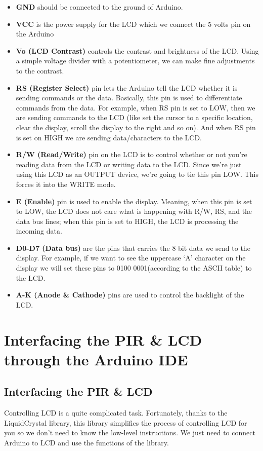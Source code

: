 \begin{itemize}
  \item \textbf{GND} should be connected to the ground of Arduino.
  \item \textbf{VCC} is the power supply for the LCD which we connect the 5 volts pin on the Arduino
  \item \textbf{Vo (LCD Contrast) } controls the contrast and brightness of the LCD. Using a simple voltage divider with a potentiometer, we can make fine adjustments to the contrast.
  \item \textbf{RS (Register Select) }  pin lets the Arduino tell the LCD whether it is sending commands or the data. Basically, this pin is used to differentiate commands from the data.
For example, when RS pin is set to LOW, then we are sending commands to the LCD (like set the cursor to a specific location, clear the display, scroll the display to the right and so on). And when RS pin is set on HIGH we are sending data/characters to the LCD.
  \item \textbf{R/W (Read/Write) } pin on the LCD is to control whether or not you’re reading data from the LCD or writing data to the LCD. Since we’re just using this LCD as an OUTPUT device, we’re going to tie this pin LOW. This forces it into the WRITE mode.
  \item \textbf{E (Enable) } pin is used to enable the display. Meaning, when this pin is set to LOW, the LCD does not care what is happening with R/W, RS, and the data bus lines; when this pin is set to HIGH, the LCD is processing the incoming data.
  \item \textbf{D0-D7 (Data bus) } are the pins that carries the 8 bit data we send to the display. For example, if we want to see the uppercase ‘A’ character on the display we will set these pins to 0100 0001(according to the ASCII table) to the LCD.
  \item \textbf{A-K (Anode \& Cathode) } pins are used to control the backlight of the LCD.
\end{itemize}


\section{Interfacing the PIR \& LCD through the Arduino IDE}
\label{sec:pir-arduino-code}
\subsection{Interfacing the PIR \& LCD}
Controlling LCD is a quite complicated task. Fortunately, thanks to the LiquidCrystal library, this library simplifies the process of controlling LCD for you so we don't need to know the low-level instructions. We just need to connect Arduino to LCD and use the functions of the library.


